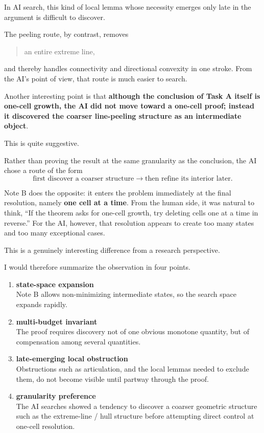 \documentclass[11pt,a4paper]{article}
\begin{document}
In AI search, this kind of local lemma whose necessity emerges only late in the argument is difficult to discover.

The peeling route, by contrast, removes

\begin{quote}
an entire extreme line,
\end{quote}

and thereby handles connectivity and directional convexity in one stroke. From the AI's point of view, that route is much easier to search.

Another interesting point is that \textbf{although the conclusion of Task A itself is one-cell growth, the AI did not move toward a one-cell proof; instead it discovered the coarser line-peeling structure as an intermediate object}.

This is quite suggestive.

Rather than proving the result at the same granularity as the conclusion, the AI chose a route of the form
\[
\text{first discover a coarser structure}
\to
\text{then refine its interior later}.
\]

Note B does the opposite: it enters the problem immediately at the final resolution, namely \textbf{one cell at a time}. From the human side, it was natural to think, ``If the theorem asks for one-cell growth, try deleting cells one at a time in reverse.'' For the AI, however, that resolution appears to create too many states and too many exceptional cases.

This is a genuinely interesting difference from a research perspective.

I would therefore summarize the observation in four points.

\begin{enumerate}[leftmargin=2.4em]
\item \textbf{state-space expansion}\\
Note B allows non-minimizing intermediate states, so the search space expands rapidly.

\item \textbf{multi-budget invariant}\\
The proof requires discovery not of one obvious monotone quantity, but of compensation among several quantities.

\item \textbf{late-emerging local obstruction}\\
Obstructions such as articulation, and the local lemmas needed to exclude them, do not become visible until partway through the proof.

\item \textbf{granularity preference}\\
The AI searches showed a tendency to discover a coarser geometric structure such as the extreme-line / hull structure before attempting direct control at one-cell resolution.
\end{enumerate}
\end{document}
